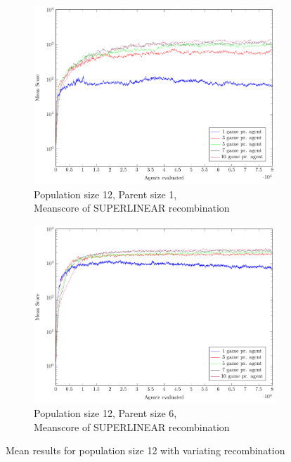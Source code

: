 \begin{figure}
\begin{subfigure}[b]{0.45\textwidth}
    \end{subfigure}
    \begin{subfigure}[b]{0.45\textwidth}
    	\centering
    	\caption{Population size 12, Parent size 1, \\ Meanscore of SUPERLINEAR recombination}
        \includegraphics[width=\textwidth]{data/cma_population_offspring/12x_split/superlinear_l12_o1/mean/PlotFile.pdf}
    \end{subfigure}
    \begin{subfigure}[b]{0.45\textwidth}
    	\centering
    	\caption{Population size 12, Parent size 6, \\ Meanscore of SUPERLINEAR recombination}
        \includegraphics[width=\textwidth]{data/cma_population_offspring/12x_split/superlinear_l12_o6/mean/PlotFile.pdf}
    \end{subfigure}
    
    \caption{Mean results for population size 12 with variating recombination}
\end{figure}

